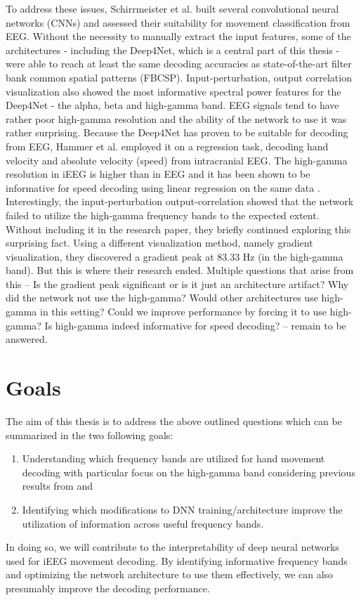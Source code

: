 To address these issues, Schirrmeister et al. \cite{schirrmeister-deep-2017} built several convolutional neural networks (CNNs) and assessed their suitability for movement classification from EEG.
Without the necessity to manually extract the input features, some of the architectures - including the Deep4Net, which is a central part of this thesis - were able to reach at least the same decoding accuracies as state-of-the-art filter bank common spatial patterns (FBCSP). 
Input-perturbation, output correlation visualization also showed the most informative spectral power features for the Deep4Net - the alpha, beta and high-gamma band.
EEG signals tend to have rather poor high-gamma resolution \cite{gamma-eeg-bad-resolution, tam-human-2019, scholg-presence-2002} and the ability of the network to use it was rather surprising. 
Because the Deep4Net has proven to be suitable for decoding from EEG, Hammer et al. \cite{Hammer-2021} employed it on a regression task, decoding hand velocity and absolute velocity (speed) from intracranial EEG. 
The high-gamma resolution in iEEG is higher than in EEG and it has been shown to be informative for speed decoding using linear regression on the same data \cite{hammer-predominance-2016}.
Interestingly, the input-perturbation output-correlation showed that the network failed to utilize the high-gamma frequency bands to the expected extent. \\

Without including it in the research paper, they briefly continued exploring this surprising fact.
Using a different visualization method, namely gradient visualization, they discovered a gradient peak at 83.33 Hz (in the high-gamma band).
But this is where their research ended. 
Multiple questions that arise from this -- Is the gradient peak significant or is it just an architecture artifact?
Why did the network not use the high-gamma?
Would other architectures use high-gamma in this setting?
Could we improve performance by forcing it to use high-gamma?
Is high-gamma indeed informative for speed decoding? -- remain to be answered.

\section*{Goals}
The aim of this thesis is to address the above outlined questions which can be summarized in the two following goals:

\begin{enumerate}
    \item Understanding which frequency bands are utilized for hand movement decoding with particular focus on the high-gamma band considering previous results from \cite{Hammer-2021} and \cite{schirrmeister-deep-2017} 
    \item Identifying which modifications to DNN training/architecture improve the utilization of information across useful frequency bands.
\end{enumerate}


In doing so, we will contribute to the interpretability of deep neural networks used for iEEG movement decoding.
By identifying informative frequency bands and optimizing the network architecture to use them effectively, we can also presumably improve the decoding performance.

